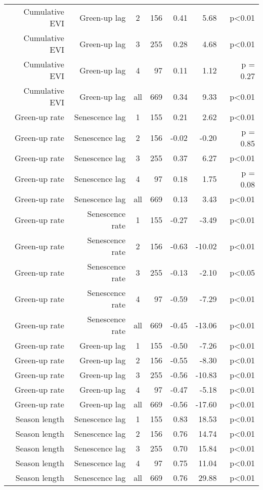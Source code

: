 \begin{table}[H]
\begin{tabular}{rrcrrrr}
  Cumulative EVI & Green-up lag & 2 & 156 & 0.41 & 5.68 & p<0.01 \\ 
  Cumulative EVI & Green-up lag & 3 & 255 & 0.28 & 4.68 & p<0.01 \\ 
  Cumulative EVI & Green-up lag & 4 &  97 & 0.11 & 1.12 & p = 0.27 \\ 
  Cumulative EVI & Green-up lag & all & 669 & 0.34 & 9.33 & p<0.01 \\ 
   \hline
Green-up rate & Senescence lag & 1 & 155 & 0.21 & 2.62 & p<0.01 \\ 
  Green-up rate & Senescence lag & 2 & 156 & -0.02 & -0.20 & p = 0.85 \\ 
  Green-up rate & Senescence lag & 3 & 255 & 0.37 & 6.27 & p<0.01 \\ 
  Green-up rate & Senescence lag & 4 &  97 & 0.18 & 1.75 & p = 0.08 \\ 
  Green-up rate & Senescence lag & all & 669 & 0.13 & 3.43 & p<0.01 \\ 
   \hline
Green-up rate & Senescence rate & 1 & 155 & -0.27 & -3.49 & p<0.01 \\ 
  Green-up rate & Senescence rate & 2 & 156 & -0.63 & -10.02 & p<0.01 \\ 
  Green-up rate & Senescence rate & 3 & 255 & -0.13 & -2.10 & p<0.05 \\ 
  Green-up rate & Senescence rate & 4 &  97 & -0.59 & -7.29 & p<0.01 \\ 
  Green-up rate & Senescence rate & all & 669 & -0.45 & -13.06 & p<0.01 \\ 
   \hline
Green-up rate & Green-up lag & 1 & 155 & -0.50 & -7.26 & p<0.01 \\ 
  Green-up rate & Green-up lag & 2 & 156 & -0.55 & -8.30 & p<0.01 \\ 
  Green-up rate & Green-up lag & 3 & 255 & -0.56 & -10.83 & p<0.01 \\ 
  Green-up rate & Green-up lag & 4 &  97 & -0.47 & -5.18 & p<0.01 \\ 
  Green-up rate & Green-up lag & all & 669 & -0.56 & -17.60 & p<0.01 \\ 
   \hline
Season length & Senescence lag & 1 & 155 & 0.83 & 18.53 & p<0.01 \\ 
  Season length & Senescence lag & 2 & 156 & 0.76 & 14.74 & p<0.01 \\ 
  Season length & Senescence lag & 3 & 255 & 0.70 & 15.84 & p<0.01 \\ 
  Season length & Senescence lag & 4 &  97 & 0.75 & 11.04 & p<0.01 \\ 
  Season length & Senescence lag & all & 669 & 0.76 & 29.88 & p<0.01 \\ 

\end{tabular}
\end{table}
